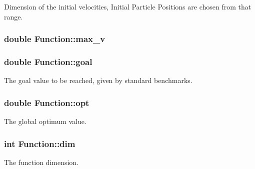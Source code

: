 Dimension of the initial velocities, Initial Particle Positions are chosen from that range. 

\hypertarget{classFunction_bacb7d7b30e0f52bcbe2cad07dfe9644}{
\subsubsection{\setlength{\rightskip}{0pt plus 5cm}double {\bf Function::max\_\-v}}}
\label{classFunction_bacb7d7b30e0f52bcbe2cad07dfe9644}


\hypertarget{classFunction_d9eec4e429707542493d16d83fcb7f54}{
\subsubsection{\setlength{\rightskip}{0pt plus 5cm}double {\bf Function::goal}}}
\label{classFunction_d9eec4e429707542493d16d83fcb7f54}


The goal value to be reached, given by standard benchmarks. 

\hypertarget{classFunction_0c7fe836998b27944251c57106ddad72}{
\subsubsection{\setlength{\rightskip}{0pt plus 5cm}double {\bf Function::opt}}}
\label{classFunction_0c7fe836998b27944251c57106ddad72}


The global optimum value. 

\hypertarget{classFunction_4b8560408fbefc8a791b70f35959d3a1}{
\subsubsection{\setlength{\rightskip}{0pt plus 5cm}int {\bf Function::dim}}}
\label{classFunction_4b8560408fbefc8a791b70f35959d3a1}


The function dimension. 

